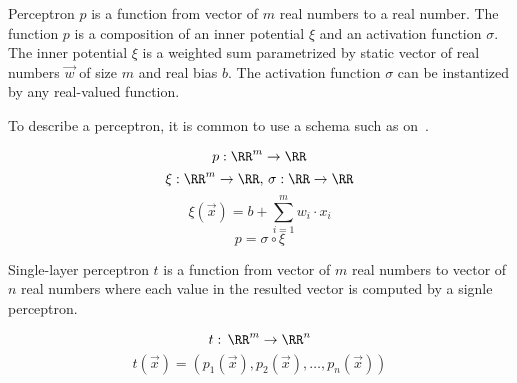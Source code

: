 \begin{definition}[Perceptron]
Perceptron $p$ is a function from vector of $m$ real numbers to a real number.
The function $p$ is a composition of an inner potential $\xi$
and an activation function $\sigma$. The inner potential $\xi$ is a weighted sum
parametrized by static vector of real numbers
$\vec w$ of size $m$ and real bias $b$.
The activation function $\sigma$ can be instantized by any real-valued function.

To describe a perceptron, it is common to use a schema such as on~.

\begin{equation*}
	p: \RR^m \to \RR
\end{equation*}
\begin{equation*}
	\xi: \RR^m \to \RR, \,
	\sigma: \RR \to \RR
\end{equation*}
\begin{equation*}
	\xi(\vec x) = b + \sum_{i=1}^m w_i\cdot x_i
\end{equation*}
\begin{equation*}
	p = \sigma \circ \xi
\end{equation*}
\end{definition}

\begin{definition}
Single-layer perceptron $t$ is a function from vector of $m$ real numbers
to vector of $n$ real numbers where each value in the resulted vector is computed
by a signle perceptron.

\begin{equation*}
    t: \, \RR^{m} \to \RR^{n}
\end{equation*}
\begin{equation*}
    t(\vec x) = (p_{1}(\vec x), p_{2}(\vec x), \ldots, p_{n}(\vec x))
\end{equation*}
\end{definition}


